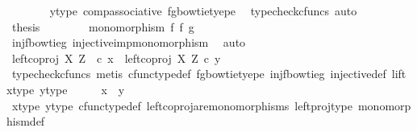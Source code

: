 \begin{isabellebody}
\ \ \ \ \ \ \isamarkupfalse%
\ y{\isacharunderscore}{\kern0pt}type{}\ comp{\isacharunderscore}{\kern0pt}associative{}\ fg{\isacharunderscore}{\kern0pt}bowtie{\isacharunderscore}{\kern0pt}tyepe\ \isamarkupfalse%
\ {\isacharparenleft}{\kern0pt}typecheck{\isacharunderscore}{\kern0pt}cfuncs{\isacharcomma}{\kern0pt}\ auto{\isacharparenright}{\kern0pt}\isanewline
\ \ \ \ \isamarkupfalse%
\ \isamarkupfalse%
\ {\isacharquery}{\kern0pt}thesis\isacommand{{\isachardot}{\kern0pt}}\isamarkupfalse%
\isanewline
\ \ \isamarkupfalse%
\isanewline
\ \ \isamarkupfalse%
\ \isamarkupfalse%
\ {\isachardoublequoteopen}monomorphism\ {\isacharparenleft}{\kern0pt}f\ {\isasymbowtie}\isactrlsub f\ g{\isacharparenright}{\kern0pt}{\isachardoublequoteclose}\isanewline
\ \ \ \ \isamarkupfalse%
\ inj{\isacharunderscore}{\kern0pt}f{\isacharunderscore}{\kern0pt}bowtie{\isacharunderscore}{\kern0pt}g\ injective{\isacharunderscore}{\kern0pt}imp{\isacharunderscore}{\kern0pt}monomorphism\ \isamarkupfalse%
\ auto\isanewline
\ \ \isamarkupfalse%
\ \isamarkupfalse%
\ {\isachardoublequoteopen}left{\isacharunderscore}{\kern0pt}coproj\ X\ Z\ \ {\isasymcirc}\isactrlsub c\ x\ {\isacharequal}{\kern0pt}\ left{\isacharunderscore}{\kern0pt}coproj\ X\ Z\ {\isasymcirc}\isactrlsub c\ y{\isachardoublequoteclose}\isanewline
\ \ \ \ \isamarkupfalse%
\ {\isacharparenleft}{\kern0pt}typecheck{\isacharunderscore}{\kern0pt}cfuncs{\isacharcomma}{\kern0pt}\ metis\ cfunc{\isacharunderscore}{\kern0pt}type{\isacharunderscore}{\kern0pt}def\ fg{\isacharunderscore}{\kern0pt}bowtie{\isacharunderscore}{\kern0pt}tyepe\ inj{\isacharunderscore}{\kern0pt}f{\isacharunderscore}{\kern0pt}bowtie{\isacharunderscore}{\kern0pt}g\ injective{\isacharunderscore}{\kern0pt}def\ lift\ x{\isacharunderscore}{\kern0pt}type{}\ y{\isacharunderscore}{\kern0pt}type{}{\isacharparenright}{\kern0pt}\isanewline
\ \ \isamarkupfalse%
\ \isamarkupfalse%
\ {\isachardoublequoteopen}x\ {\isacharequal}{\kern0pt}\ y{\isachardoublequoteclose}\isanewline
\ \ \ \ \isamarkupfalse%
\ x{\isacharunderscore}{\kern0pt}type{}\ y{\isacharunderscore}{\kern0pt}type{}\ cfunc{\isacharunderscore}{\kern0pt}type{\isacharunderscore}{\kern0pt}def\ left{\isacharunderscore}{\kern0pt}coproj{\isacharunderscore}{\kern0pt}are{\isacharunderscore}{\kern0pt}monomorphisms\ left{\isacharunderscore}{\kern0pt}proj{\isacharunderscore}{\kern0pt}type\ monomorphism{\isacharunderscore}{\kern0pt}def\ \isamarkupfalse%

\end{isabellebody}
